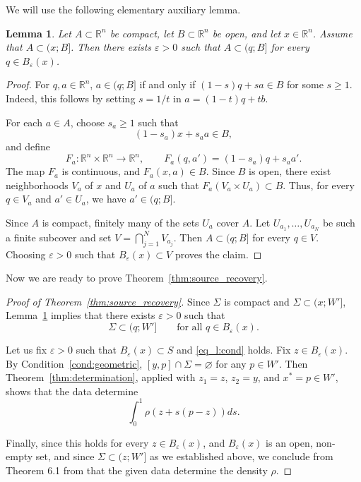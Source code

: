 \documentclass[12pt,a4paper]{amsart}
\numberwithin{equation}{section}
\theoremstyle{plain}
\newtheorem{lemma}[theorem]{Lemma}
\theoremstyle{definition}
\begin{document}
We will use the following elementary auxiliary lemma.
\begin{lemma}\label{stab}
Let $A\subset\mathbb{R}^n$ be compact, let $B\subset\mathbb{R}^n$ be open, and let $x\in\mathbb{R}^n$. Assume that $A\subset (x;B]$. Then there exists $\varepsilon>0$ such that $A\subset (q;B]$ for every $q\in B_\varepsilon(x)$.
\end{lemma}
\begin{proof}
For $q,a\in\mathbb{R}^n$, $a\in(q;B]$ if and only if $(1-s)q+sa\in B$ for some $s\geq 1$. Indeed, this follows by setting $s=1/t$ in
$a=(1-t)q+tb$.

For each $a\in A$, choose $s_a\geq 1$ such that 
\[
(1-s_a)x+s_a a\in B,
\]
and define
\[
F_a:\mathbb{R}^n\times\mathbb{R}^n\to\mathbb{R}^n,
\qquad
F_a(q,a')=(1-s_a)q+s_a a'.
\]
The map $F_a$ is continuous, and $F_a(x,a)\in B$. Since $B$ is open,
there exist neighborhoods $V_a$ of $x$ and $U_a$ of $a$ such that $F_a(V_a\times U_a)\subset B$. Thus, for every $q\in V_a$ and $a'\in U_a$, we have $a'\in(q;B]$.

Since $A$ is compact, finitely many of the sets $U_a$ cover $A$.
Let $U_{a_1},\ldots,U_{a_N}$ be such a finite subcover and set $V=\bigcap_{j=1}^N V_{a_j}$. Then $A\subset(q;B]$ for every $q\in V$. Choosing $\varepsilon>0$
such that $B_\varepsilon(x)\subset V$ proves the claim.
\end{proof}



Now we are ready to prove Theorem~\ref{thm:source_recovery}.

\begin{proof}[Proof of Theorem~\ref{thm:source_recovery}]
Since $\Sigma$ is compact and $\Sigma\subset(x;W']$, Lemma~\ref{stab} implies that there exists $\varepsilon>0$ such that
\begin{equation}\label{eq_l:cond}
\Sigma\subset(q;W']
\qquad\text{for all }q\in B_\varepsilon(x).
\end{equation}

Let us fix $\varepsilon>0$ such that $B_\varepsilon(x) \subset S$ and \eqref{eq_l:cond} holds. Fix $z\in B_\varepsilon(x)$. By Condition~\ref{cond:geometric}, $[y,p]\cap\Sigma=\varnothing$ for any $p\in W'$. Then Theorem~\ref{thm:determination}, applied with $z_1=z$, $z_2=y$, and $x^*=p\in W'$, shows that the data determine
\begin{equation*}
    \int_0^1 \rho(z+s(p-z)) ds.
\end{equation*}

Finally, since this holds for every $z \in B_\varepsilon(x)$, and $B_\varepsilon(x)$ is an open, non-empty set, and since $\Sigma \subset (z; W']$ as we established above, we conclude from Theorem 6.1 from \cite{JatharKarKrishnanPattar} that the given data determine the density $\rho$.
\end{proof}
\end{document}
